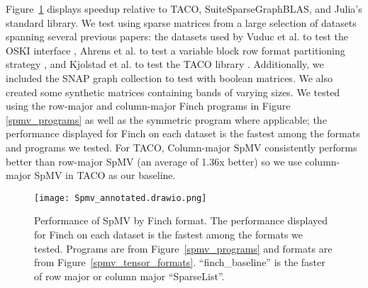   Figure~\ref{fig:spmv_grouped} displays speedup relative to TACO, SuiteSparseGraphBLAS, and Julia’s standard library.  We test using sparse matrices from a large selection of datasets spanning several previous papers: the datasets used by Vuduc et al. to test the OSKI interface \cite{vuduc2005oski}, Ahrens et al. to test a variable block row format partitioning strategy \cite{ahrens_optimal_2021}, and Kjolstad et al. to test the TACO library \cite{kjolstad_tensor_2017}. Additionally, we included the SNAP graph collection to test with boolean matrices. We also created some synthetic matrices containing bands of varying sizes.
  We tested using the row-major and column-major Finch programs in Figure \ref{spmv_programs} as well as the symmetric program where applicable; the performance displayed for Finch on each dataset is the fastest among the formats and programs we tested. For TACO, Column-major SpMV consistently performs better than row-major SpMV (an average of 1.36x better) so we use column-major SpMV in TACO as our baseline.
   
  \begin{figure}[!h]
    \texttt{[image: Spmv\_annotated.drawio.png]}
    \caption{\footnotesize Performance of SpMV by Finch format. The performance displayed for Finch on each dataset is the fastest among the formats we tested. Programs are from Figure~\ref{spmv_programs} and formats are from Figure~\ref{spmv_tensor_formats}. ``finch\_baseline'' is the faster of row major or column major ``SparseList''.}
    \label{fig:spmv_grouped}
  \end{figure} 

